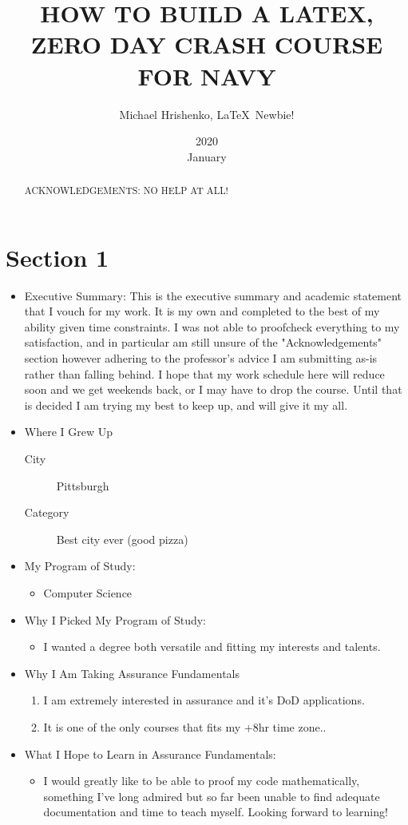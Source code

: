 \documentclass{article}
\title{HOW TO BUILD A LATEX, ZERO DAY CRASH COURSE FOR NAVY}
\date{2020\\ January}
\author{Michael Hrishenko, \LaTeX\ Newbie!}
\begin{document}
\maketitle

\begin{abstract}
   \lipsum[1]
   \linebreak
   ACKNOWLEDGEMENTS: NO HELP AT ALL!
\end{abstract}

\section{Section 1}
\label{sec:SEC1}

\begin{itemize}
  \item Executive Summary:
  This is the executive summary and academic statement that I vouch for my work. It is my own and completed to the best of my ability given time constraints. I was not able to proofcheck everything to my satisfaction, and in particular am still unsure of the "Acknowledgements" section however adhering to the professor's advice I am submitting as-is rather than falling behind. I hope that my work schedule here will reduce soon and we get weekends back, or I may have to drop the course. Until that is decided I am trying my best to keep up, and will give it my all.
  \item Where I Grew Up
  \begin{description}
    \item[City]
    Pittsburgh
    \item[Category]
    Best city ever (good pizza)
  \end{description}
  \item My Program of Study:
  \begin{itemize}
    \item Computer Science
  \end{itemize}
  \item Why I Picked My Program of Study:
  \begin{itemize}
    \item I wanted a degree both versatile and fitting my interests and talents.
  \end{itemize}
  \item Why I Am Taking Assurance Fundamentals
  \begin{enumerate}
    \item I am extremely interested in assurance and it's DoD applications.
    \item It is one of the only courses that fits my +8hr time zone..
  \end{enumerate}
  \item What I Hope to Learn in Assurance Fundamentals:
  \begin{itemize}
    \item I would greatly like to be able to proof my code mathematically, something I've long admired but so far been unable to find adequate documentation and time to teach myself. Looking forward to learning!
  \end{itemize}
\end{itemize}
\end{document}
